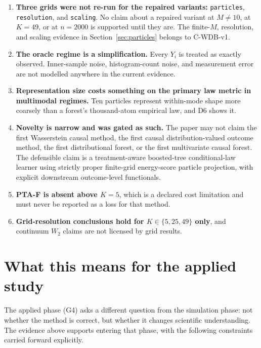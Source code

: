 \documentclass[11pt,a4paper]{article}
\theoremstyle{definition}
\theoremstyle{remark}
\begin{document}
\begin{enumerate}
the transfer capability survives while its sharpest instance does not. This
limitation is not stated in either gate memo and was surfaced by the complete
tables in Section~\ref{sec:complete}.
\item \textbf{Three grids were not re-run for the repaired variants:}
\texttt{particles}, \texttt{resolution}, and \texttt{scaling}. No claim about a
repaired variant at $M \neq 10$, at $K = 49$, or at $n = 2000$ is supported until
they are. The finite-$M$, resolution, and scaling evidence in
Section~\ref{sec:particles} belongs to C-WDB-v1.
\item \textbf{The oracle regime is a simplification.} Every $Y_i$ is treated as
exactly observed. Inner-sample noise, histogram-count noise, and measurement
error are not modelled anywhere in the current evidence.
\item \textbf{Representation size costs something on the primary law metric in
multimodal regimes.} Ten particles represent within-mode shape more coarsely than
a forest's thousand-atom empirical law, and D6 shows it.
\item \textbf{Novelty is narrow and was gated as such.} The paper may not claim
the first Wasserstein causal method, the first causal distribution-valued outcome
method, the first distributional forest, or the first multivariate causal forest.
The defensible claim is a treatment-aware boosted-tree conditional-law learner
using strictly proper finite-grid energy-score particle projection, with explicit
downstream outcome-level functionals.
\item \textbf{PTA-F is absent above $K = 5$}, which is a declared cost limitation
and must never be reported as a loss for that method.
\item \textbf{Grid-resolution conclusions hold for $K \in \{5, 25, 49\}$ only},
and continuum $W_2$ claims are not licensed by grid results.
\end{enumerate}

\section{What this means for the applied study}

The applied phase (G4) asks a different question from the simulation phase: not
whether the method is correct, but whether it changes scientific understanding.
The evidence above supports entering that phase, with the following constraints
carried forward explicitly.
\end{document}
